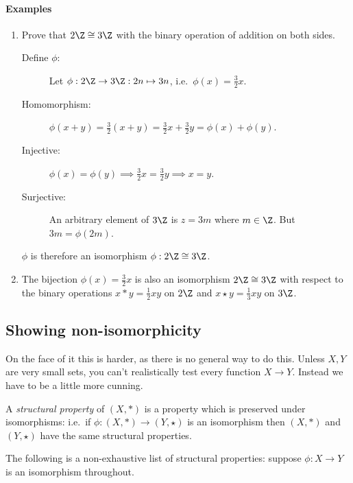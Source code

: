 \paragraph{Examples}
\begin{enumerate}
  \item Prove that $2\Z\cong 3\Z$ with the binary operation of addition on both sides.
  \begin{description}
      \item[Define $\phi$:] Let $\phi:2\Z\to 3\Z:2n\mapsto 3n$, i.e.\ $\phi(x)=\frac{3}{2}x$.
      \item[Homomorphism:] $\phi(x+y)=\frac{3}{2}(x+y)=\frac{3}{2}x+\frac{3}{2}y=\phi(x)+\phi(y)$.\ \ \checkmark
      \item[Injective:] $\phi(x)=\phi(y)\implies \frac{3}{2}x=\frac{3}{2}y\implies x=y$.\  \ \checkmark
      \item[Surjective:] An arbitrary element of $3\Z$ is $z=3m$ where $m\in\Z$. But $3m=\phi(2m)$.\ \ \checkmark
  \end{description}
  $\phi$ is therefore an isomorphism $\phi:2\Z\cong 3\Z$.
  \item The bijection $\phi(x)=\frac 32 x$ is also an isomorphism $2\Z\cong 3\Z$ with respect to the binary operations $x*y=\frac{1}{2}xy$ on $2\Z$ and $x\star y=\frac{1}{3}xy$ on $3\Z$.
\end{enumerate}

\subsection*{Showing non-isomorphicity}

On the face of it this is harder, as there is no general way to do this. Unless $X,Y$ are very small sets, you can't realistically test every function $X\to Y$. Instead we have to be a little more cunning.

\begin{defn}
A \emph{structural property} of $(X,*)$ is a property which is preserved under isomorphisms: i.e.\ if $\phi:(X,*)\to (Y,\star)$ is an isomorphism then $(X,*)$ and $(Y,\star)$ have the same structural properties.
\end{defn}

The following is a non-exhaustive list of structural properties: suppose $\phi:X\to Y$ is an isomorphism throughout.

